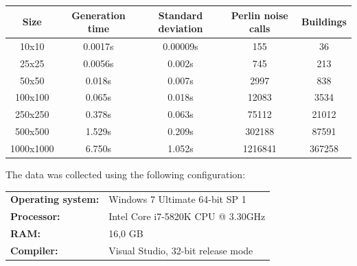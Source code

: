 	\begin{center}
		\begin{tabular}{|c | c c c c|} 
			\hline
			Size & Generation time & Standard deviation & Perlin noise calls & Buildings \\ [0.9ex] 
			\hline\hline
			10x10 & 0.0017s & 0.00009s & 155 & 36 \\ 
			\hline
			25x25 & 0.0056s & 0.002s & 745 & 213 \\
			\hline
			50x50 & 0.018s & 0.007s & 2997 & 838 \\
			\hline
			100x100 & 0.065s & 0.018s & 12083 & 3534 \\
			\hline
			250x250 & 0.378s & 0.063s & 75112 & 21012 \\
			\hline
			500x500 & 1.529s & 0.209s & 302188 & 87591 \\
			\hline
			1000x1000 & 6.750s & 1.052s & 1216841 & 367258 \\ [2ex] 
			\hline
		\end{tabular}
	\end{center}
	
	\begin{flushleft}
	The data was collected using the following configuration: \\
	\end{flushleft}
	\begin{tabular}{l l}
		\textbf{Operating system:} & Windows 7 Ultimate 64-bit SP 1 \\
		\textbf{Processor:} & Intel Core i7-5820K CPU @ 3.30GHz \\
		\textbf{RAM:} & 16,0 GB \\
		\textbf{Compiler:} & Visual Studio, 32-bit release mode \\
	\end{tabular}
	
